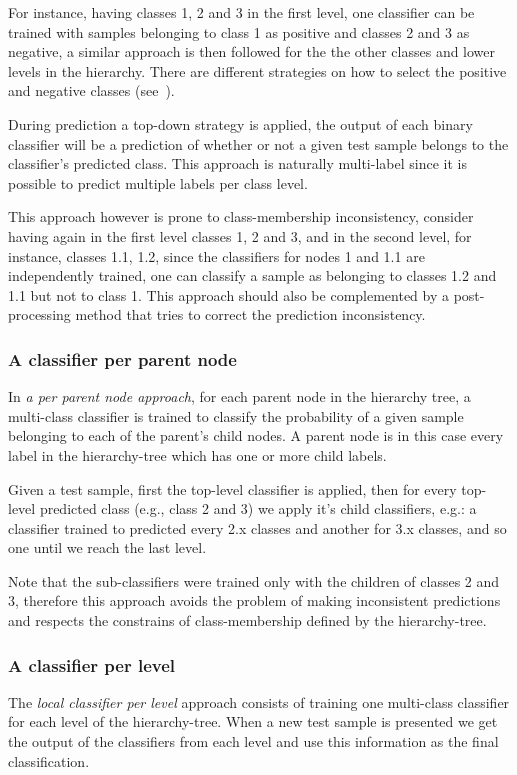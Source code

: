 \documentclass[11pt,a4paper]{article}
\begin{document}
For instance, having classes 1, 2 and 3 in the first level, one classifier can be trained with
samples belonging to class 1 as positive and classes 2 and 3 as negative, a similar approach is then
followed for the the other classes and lower levels in the hierarchy. There are different strategies
on how to select the positive and negative classes (see~\cite{}).

During prediction a top-down strategy is applied, the output of each binary classifier will be a
prediction of whether or not a given test sample belongs to the classifier’s predicted class. This
approach is naturally multi-label since it is possible to predict multiple labels per class level.

This approach however is prone to class-membership inconsistency, consider having again in the first
level classes 1, 2 and 3, and in the second level, for instance, classes 1.1, 1.2, since the
classifiers for nodes 1 and 1.1 are independently trained, one can classify a sample as belonging to
classes 1.2 and 1.1 but not to class 1. This approach should also be complemented by a
post-processing method that tries to correct the prediction inconsistency.


\subsubsection{A classifier per parent node} %
In \textit{a per parent node approach}, for each parent node in the hierarchy tree, a multi-class
classifier is trained to classify the probability of a given sample belonging to each of the parent's
child nodes. A parent node is in this case every label in the hierarchy-tree which has one or more
child labels.

Given a test sample, first the top-level classifier is applied, then for every top-level
predicted class (e.g., class 2 and 3) we apply it's child classifiers, e.g.: a classifier
trained to predicted every 2.x classes and another for 3.x classes, and so one until we reach the
last level.

Note that the sub-classifiers were trained only with the children of classes 2 and 3, therefore
this approach avoids the problem of making inconsistent predictions and respects the constrains
of class-membership defined by the hierarchy-tree.


\subsubsection{A classifier per level} %
The \textit{local classifier per level} approach consists of training one multi-class classifier
for each level of the hierarchy-tree. When a new test sample is presented we get the output of the
classifiers from each level and use this information as the final classification.
\end{document}

